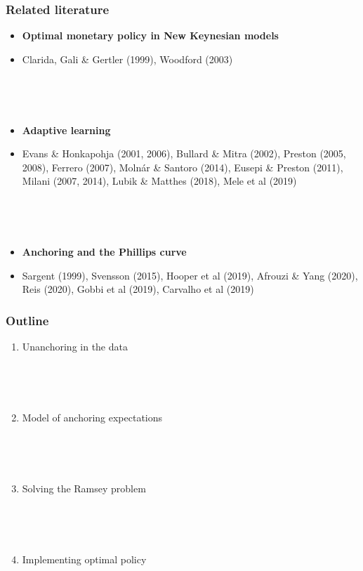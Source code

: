 \documentclass[10pt]{beamer}
\begin{document}
\begin{frame}
	\frametitle{Related literature}

\begin{itemize}
\item \textbf{Optimal monetary policy in New Keynesian models}
\item[] Clarida, Gali \& Gertler (1999), Woodford (2003)

\

\

\item \textbf{Adaptive learning}
\item[] Evans \& Honkapohja (2001, 2006), Bullard \& Mitra (2002), Preston (2005, 2008), Ferrero (2007), Moln\'ar \& Santoro (2014), Eusepi \& Preston (2011), Milani (2007, 2014), Lubik \& Matthes (2018), Mele et al (2019)

\

\

\item \textbf{Anchoring and the Phillips curve} 
\item[] Sargent (1999), Svensson (2015), Hooper et al (2019), Afrouzi \& Yang (2020), Reis (2020), Gobbi et al (2019), Carvalho et al (2019)
\end{itemize}



\end{frame}

\begin{frame}
	\frametitle{Outline}

\begin{enumerate}
\item Unanchoring in the data

\

\

\item Model of anchoring expectations

\

\

\item Solving the Ramsey problem

\

\

\item Implementing optimal policy
\end{enumerate}



\end{frame}
\end{document}
